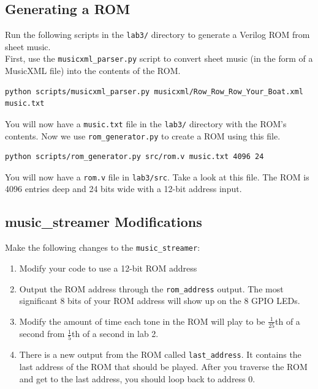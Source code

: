 \documentclass[11pt]{article}
\begin{document}
\subsection{Generating a ROM}
Run the following scripts in the \verb|lab3/| directory to generate a Verilog ROM from sheet music.\\

First, use the \verb|musicxml_parser.py| script to convert sheet music (in the form of a MusicXML file) into the contents of the ROM.

\begin{verbatim}
python scripts/musicxml_parser.py musicxml/Row_Row_Row_Your_Boat.xml music.txt
\end{verbatim}

You will now have a \verb|music.txt| file in the \verb|lab3/| directory with the ROM's contents. Now we use \verb|rom_generator.py| to create a ROM using this file.

\begin{verbatim}
python scripts/rom_generator.py src/rom.v music.txt 4096 24
\end{verbatim}

You will now have a \verb|rom.v| file in \verb|lab3/src|. Take a look at this file. The ROM is 4096 entries deep and 24 bits wide with a 12-bit address input. 

\subsection{music\_streamer Modifications}

Make the following changes to the \verb|music_streamer|:

\begin{enumerate}
	\item Modify your code to use a 12-bit ROM address
	
	\item Output the ROM address through the \verb|rom_address| output. The most significant 8 bits of your ROM address will show up on the 8 GPIO LEDs.
	
	\item Modify the amount of time each tone in the ROM will play to be $\frac{1}{25}$th of a second from $\frac{1}{5}$th of a second in lab 2.
	
	\item There is a new output from the ROM called \verb|last_address|. It contains the last address of the ROM that should be played. After you traverse the ROM and get to the last address, you should loop back to address 0.
\end{enumerate}
\end{document}
